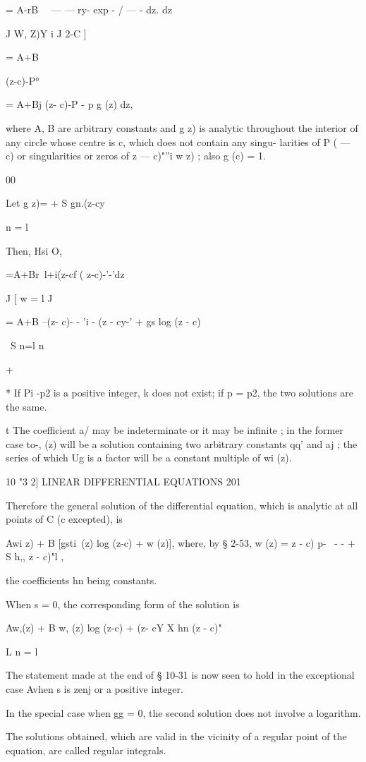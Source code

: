  = A-rB\ ~ — — ry- exp - / — - dz. dz

J W, Z)Y i J 2-C ]

= A+B

(z-c)-P°

= A+Bj (z- c)-P - p g (z) dz,

where A, B are arbitrary constants and g z) is analytic throughout the
interior of any circle whose centre is c, which does not contain any
singu- larities of P ( — c) or singularities or zeros of z — c)"''i w
z) ; also g (c) = 1.

00

Let g z)= + S gn.(z-cy\

n = l

Then, Hsi O,

 =A+Br\ l+i(z-cf ( z-c)-'-'dz

J [ w = l J

= A+B --(z- c)- - 'i - (z - cy-' + gs log (z - c)

\ S n=l n

+ %

* If Pi -p2 is a positive integer, k does not exist; if p = p2, the
two solutions are the same.

t The coefficient a/ may be indeterminate or it may be infinite ; in
the former case to-, (z) will be a solution containing two arbitrary
constants qq' and aj ; the series of which Ug is a factor will be a
constant multiple of wi (z).

10 "3 2] LINEAR DIFFERENTIAL EQUATIONS 201

Therefore the general solution of the differential equation, which is
analytic at all points of C (c excepted), is

Awi z) + B [gsti\ (z) log (z-c) + w (z)], where, by § 2-53, w (z) = z
- c) p- \ - - + S h,, z - c)"l ,

the coefficients hn being constants.

When s = 0, the corresponding form of the solution is

Aw,(z) + B w, (z) log (z-c) + (z- cY X hn (z - c)"

L n = l \

The statement made at the end of § 10-31 is now seen to hold in the
exceptional case Avhen s is zenj or a positive integer.

In the special case when gg = 0, the second solution does not involve
a logarithm.

The solutions obtained, which are valid in the vicinity of a regular
point of the equation, are called regular integrals.

